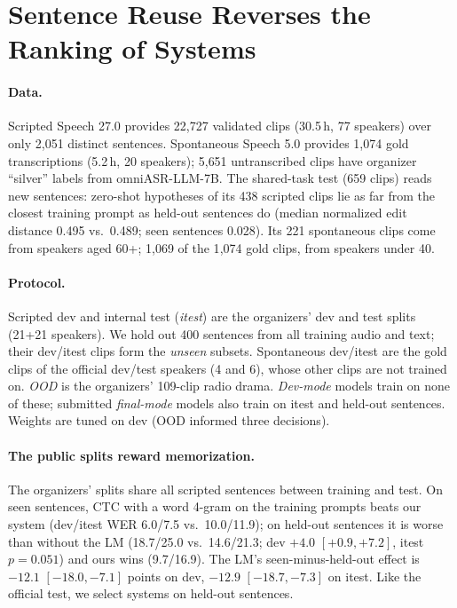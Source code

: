 \documentclass[runningheads]{llncs}
\newcommand{\ci}[2]{$[#1,#2]$}  %
\begin{document}
\section{Sentence Reuse Reverses the Ranking of Systems}\label{sec:data}
\paragraph{Data.} Scripted Speech 27.0 provides 22{,}727 validated clips (30.5\,h, 77 speakers)
over only 2{,}051 distinct sentences. Spontaneous Speech 5.0 provides 1{,}074 gold transcriptions
(5.2\,h, 20 speakers); 5{,}651 untranscribed clips have organizer ``silver'' labels from
omniASR-LLM-7B. The shared-task test (659 clips) reads new sentences:
zero-shot hypotheses of its 438 scripted clips lie as far from the closest training prompt as
held-out sentences do (median normalized edit distance 0.495 vs.\ 0.489; seen sentences 0.028).
Its 221 spontaneous clips come from speakers aged 60+; 1{,}069 of the 1{,}074 gold clips, from
speakers under 40.

\paragraph{Protocol.} Scripted dev and internal test (\emph{itest}) are the organizers' dev and
test splits (21+21 speakers). We hold out 400 sentences from all training audio and text; their
dev/itest clips form the \emph{unseen} subsets. Spontaneous dev/itest are the gold clips of the
official dev/test speakers (4 and 6), whose other clips are not trained on. \emph{OOD} is the
organizers' 109-clip radio drama. \emph{Dev-mode} models train on none of these; submitted
\emph{final-mode} models also train on itest and held-out sentences. Weights are tuned on dev
(OOD informed three decisions).

\paragraph{The public splits reward memorization.} The organizers' splits share all
scripted sentences between training and test. On seen
sentences, CTC with a word 4-gram on the training prompts beats our system (dev/itest WER
6.0/7.5 vs.\ 10.0/11.9); on held-out sentences it is worse than without the LM (18.7/25.0 vs.\
14.6/21.3; dev $+4.0$ \ci{+0.9}{+7.2}, itest $p{=}0.051$) and ours wins (9.7/16.9). The LM's seen-minus-held-out effect is $-12.1$
\ci{-18.0}{-7.1} points on dev, $-12.9$ \ci{-18.7}{-7.3} on itest. Like the official test, we
select systems on held-out sentences.
\end{document}
